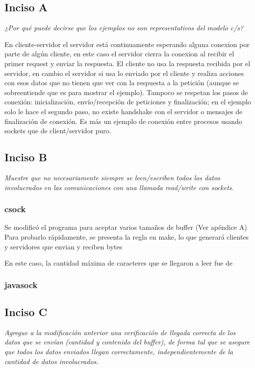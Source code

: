 \documentclass[12pt,journal,compsoc]{IEEEtran}
\begin{document}
\subsection{Inciso A}
\textit{¿Por qué puede decirse que los ejemplos no son representativos del modelo c/s?}

En cliente-servidor el servidor está continuamente esperando alguna conexion por parte de algún cliente, en este caso el servidor cierra la conexion al recibir el primer request y enviar la respuesta. El cliente no usa la respuesta recibida por el servidor, en cambio el servidor si usa lo enviado por el cliente y realiza acciones con esos datos que no tienen que ver con la respuesta a la petición (aunque se sobreentiende que es para mostrar el ejemplo).
Tampoco se respetan los pasos de conexión: inicialización, envío/recepción de peticiones y finalización; en el ejemplo solo le hace el segundo paso, no existe handshake con el servidor o mensajes de finalización de conexión. Es más un ejemplo de conexión entre procesos usando sockets que de client/servidor puro.

\subsection{Inciso B}
\textit{Muestre que no necesariamente siempre se leen/escriben todos los datos involucrados en
las comunicaciones con una llamada read/write con sockets.}
\subsubsection{csock}
Se modificó el programa para aceptar varios tamaños de buffer (Ver apéndice A)
Para probarlo rápidamente, se presenta la regla en make, lo que generará clientes y servidores que envian y reciben bytes

En este caso, la cantidad máxima de caracteres que se llegaron a leer fue de 



\subsubsection{javasock}
\subsection{Inciso C}
\textit{Agregue a la modificación anterior una verificación de llegada correcta de los datos que se
envían (cantidad y contenido del buffer), de forma tal que se asegure que todos los datos
enviados llegan correctamente, independientemente de la cantidad de datos
involucrados.}
\end{document}
